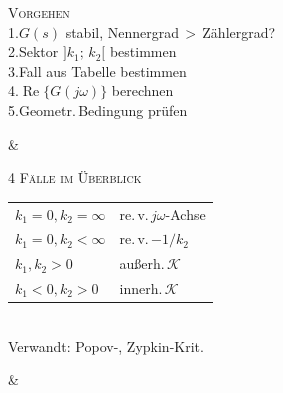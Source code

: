 \begin{formelreihe}
  \parbox[t]{\linewidth}{%
    {\scriptsize\scshape\color{gray!65!black} Vorgehen}\\[0.03em]%
    \scriptsize
    1.\;$G(s)$ stabil, Nennergrad\,$>$\,Zählergrad?\\
    2.\;Sektor $]k_1;\,k_2[$ bestimmen\\
    3.\;Fall aus Tabelle bestimmen\\
    4.\;$\operatorname{Re}\{G(j\omega)\}$ berechnen\\
    5.\;Geometr.\,Bedingung prüfen} &
  \parbox[t]{\linewidth}{%
    {\scriptsize\scshape\color{gray!65!black} 4 Fälle im Überblick}\\[0.03em]%
    {\renewcommand{\arraystretch}{0.88}\scriptsize%
    \begin{tabular}{@{}l@{\;}l@{}}
      $k_1\!=\!0,k_2\!=\!\infty$ & re.\,v.\,$j\omega$-Achse\\
      $k_1\!=\!0,k_2\!<\!\infty$ & re.\,v.\,$-1/k_2$\\
      $k_1,k_2\!>\!0$ & außerh.\,$\mathcal{K}$\\
      $k_1\!<\!0,k_2\!>\!0$ & innerh.\,$\mathcal{K}$\\
    \end{tabular}}\\[0.08em]
    \scriptsize Verwandt: Popov-, Zypkin-Krit.} &
   \\
\end{formelreihe}
\bereichende
